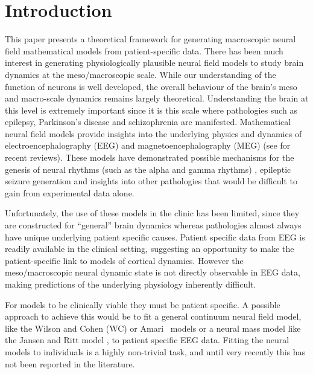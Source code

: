 \documentclass[12pt]{iopart}
\begin{document}
\maketitle

\section{Introduction} This paper presents a theoretical framework for generating macroscopic neural field mathematical models from patient-specific data. There has been much interest in generating physiologically plausible neural field models to study brain dynamics at the meso/macroscopic scale. While our understanding of the function of neurons is well developed, the overall behaviour of the brain's meso and macro-scale dynamics remains largely theoretical. Understanding the brain at this level is extremely important since it is this scale where pathologies such as epilepsy, Parkinson's disease and schizophrenia are manifested. Mathematical neural field models provide insights into the underlying physics and dynamics of electroencephalography (EEG) and magnetoencephalography (MEG) (see \cite{Deco2008,David2003} for recent reviews). These models have demonstrated possible mechanisms for the genesis of neural rhythms (such as the alpha and gamma rhythms) \cite{Liley1999,RENNIE2000}, epileptic seizure generation \cite{DaSilva2003,Suffczynski2004,Wendling2005} and insights into other pathologies \cite{Moran2008,Schiff2009} that would be difficult to gain from experimental data alone. 

Unfortunately, the use of these models in the clinic has been limited, since they are constructed for ``general'' brain dynamics whereas pathologies almost always have unique underlying patient specific causes. Patient specific data from EEG is readily available in the clinical setting, suggesting an opportunity to make the patient-specific link to models of cortical dynamics. However the meso/macroscopic neural dynamic state is not directly observable in EEG data, making predictions of the underlying physiology inherently difficult.

For models to be clinically viable they must be patient specific. A possible approach to achieve this would be to fit a general continuum neural field model, like the Wilson and Cohen (WC) or Amari~\cite{Wilson1973,Amari1977}  models or a neural mass model like the Jansen and Ritt model \cite{Jansen1995}, to patient specific EEG data. Fitting the neural models to individuals is a highly non-trivial task, and until very recently this has not been reported in the literature. 
\end{document}
